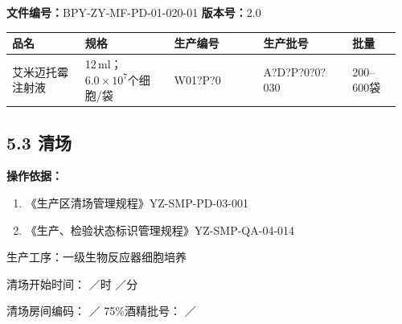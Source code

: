 \documentclass[UTF8,10pt,a4paper,fontset=fandol]{ctexart}
\newcommand{\fieldvalue}[1]{#1}
\newcommand{\handwritten}[1]{#1}
\begin{document}
\noindent
\textbf{文件编号：}BPY-ZY-MF-PD-01-020-01\qquad
\textbf{版本号：}2.0

\begin{center}
\begin{tabular}{|p{0.18\linewidth}|p{0.22\linewidth}|p{0.22\linewidth}|p{0.22\linewidth}|p{0.12\linewidth}|}
\hline
品名 & 规格 & 生产编号 & 生产批号 & 批量 \\
\hline
\fieldvalue{艾米迈托霉注射液} &
\fieldvalue{12\,ml；$6.0\times10^{7}$个细胞/袋} &
\fieldvalue{\handwritten{W01?P?0}} &
\fieldvalue{\handwritten{A?D?P?0?0?030}} &
\fieldvalue{200--600袋} \\
\hline
\end{tabular}
\end{center}

\subsection*{5.3 清场}

\textbf{操作依据：}

\begin{enumerate}
    \item 《生产区清场管理规程》\hfill YZ-SMP-PD-03-001
    \item 《生产、检验状态标识管理规程》\hfill YZ-SMP-QA-04-014
\end{enumerate}

\noindent
生产工序：一级生物反应器细胞培养

\noindent
清场开始时间：
\fieldvalue{\handwritten{／}}时\quad
\fieldvalue{\handwritten{／}}分

\noindent
清场房间编码：
\fieldvalue{\handwritten{／}}
\hfill
75\%酒精批号：
\fieldvalue{\handwritten{／}}
\end{document}
